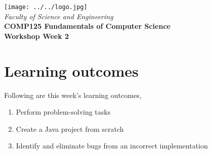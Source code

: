 \usepackage[T1]{fontenc}
\usepackage{pslatex}
 \usepackage[pdftex]{color}  
 \usepackage[pdftex]{graphicx}     
\usepackage{verbatim}
\usepackage{xcolor}
\usepackage{paralist}

\usepackage[colorlinks=true,urlcolor=red]{hyperref}
\setlength{\topmargin}{-0.5in}                  %
\setlength{\textheight}{9.5in}                  %
\setlength{\oddsidemargin}{0in}                 %
\setlength{\evensidemargin}{0in}                %
\setlength{\textwidth}{6.5in}                   %
\setlength{\parindent}{0.0in}
\newcommand{\code}{\texttt}

\usepackage{listings}




%
\vspace{0.2in}
\begin{center}
        {\large  %
\texttt{[image: ../../logo.jpg]}\\
\medskip
        {\it  Faculty of Science and Engineering\\}
        \vspace{0.2in}
         {\bf COMP125 Fundamentals of Computer Science\\
        Workshop Week 2\\}}
\end{center}
\vspace{0.3in}
%

\renewcommand{\labelenumi}{\alph{enumi}.}
 
\section*{Learning outcomes}
Following are this week's learning outcomes,
\begin{enumerate}
\item Perform problem-solving tasks
\item Create a Java project from scratch
\item Identify and eliminate bugs from an incorrect implementation
\end{enumerate}

